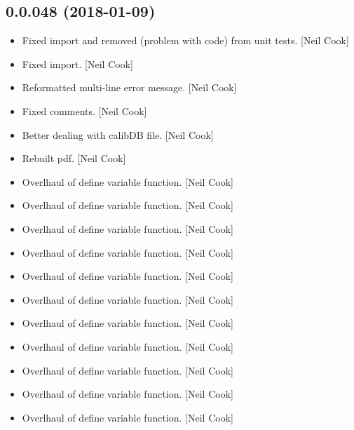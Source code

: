 \documentclass[a4paper,10pt,english]{report}
\begin{document}
\subsection{0.0.048 (2018-01-09)}
\label{\detokenize{misc/changelog:id505}}\begin{itemize}
\item {} 
Fixed import and removed  (problem with code) from unit tests.
{[}Neil Cook{]}

\item {} 
Fixed import. {[}Neil Cook{]}

\item {} 
Reformatted multi-line error message. {[}Neil Cook{]}

\item {} 
Fixed comments. {[}Neil Cook{]}

\item {} 
Better dealing with calibDB file. {[}Neil Cook{]}

\item {} 
Rebuilt pdf. {[}Neil Cook{]}

\item {} 
Overlhaul of define variable function. {[}Neil Cook{]}

\item {} 
Overlhaul of define variable function. {[}Neil Cook{]}

\item {} 
Overlhaul of define variable function. {[}Neil Cook{]}

\item {} 
Overlhaul of define variable function. {[}Neil Cook{]}

\item {} 
Overlhaul of define variable function. {[}Neil Cook{]}

\item {} 
Overlhaul of define variable function. {[}Neil Cook{]}

\item {} 
Overlhaul of define variable function. {[}Neil Cook{]}

\item {} 
Overlhaul of define variable function. {[}Neil Cook{]}

\item {} 
Overlhaul of define variable function. {[}Neil Cook{]}

\item {} 
Overlhaul of define variable function. {[}Neil Cook{]}

\item {} 
Overlhaul of define variable function. {[}Neil Cook{]}


\end{itemize}
\end{document}
